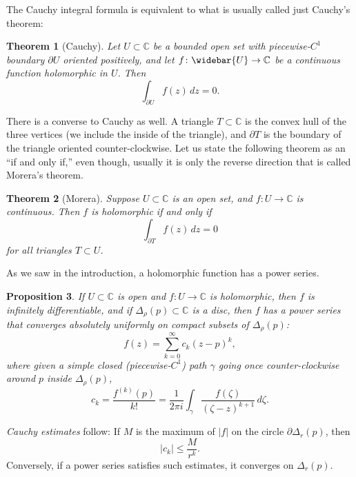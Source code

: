 \documentclass[12pt,openany]{book}
\newcommand{\sabs}[1]{\lvert {#1} \rvert}
\newcommand{\C}{{\mathbb{C}}}
\newcommand{\myindex}[1]{#1\index{#1}}
\theoremstyle{plain}
\newtheorem{thm}{Theorem}[section]
\newtheorem{prop}[thm]{Proposition}
\theoremstyle{remark}
\theoremstyle{definition}
\theoremstyle{exercise}
\theoremstyle{example}
\begin{document}
The Cauchy integral formula is equivalent to
what is usually called just Cauchy's theorem:

\begin{thm}[Cauchy]
Let $U \subset \C$ be a bounded open set with piecewise-$C^1$ boundary
$\partial U$ oriented positively, and let
$f \colon \widebar{U} \to \C$ be a continuous function
holomorphic in $U$.  Then
\begin{equation*}
\int_{\partial U}
f(z) \, dz = 0 .
\end{equation*}
\end{thm}

There is a converse to Cauchy as well.  A triangle $T \subset \C$ is
the convex hull of the three vertices (we include the inside of the
triangle), and $\partial T$ is the boundary of the triangle oriented
counter-clockwise.  Let us state the following theorem as an
``if and only if,'' even though, usually it is only the reverse direction that
is called Morera's theorem.

\begin{thm}[Morera] \label{thm:onevarmorera}
Suppose $U \subset \C$ is an open set, and $f \colon U \to \C$
is continuous.  Then $f$ is holomorphic
if and only if
\begin{equation*}
\int_{\partial T} f(z) \, dz = 0
\end{equation*}
for all triangles $T \subset U$.
\end{thm}

As we saw in the introduction, a holomorphic function has a power series.

\begin{prop}
If $U \subset \C$ is open and $f \colon U \to \C$ is holomorphic,
then $f$ is infinitely differentiable, and if $\Delta_\rho(p) \subset \C$
is a disc, then $f$ has a power series that
converges absolutely uniformly on compact subsets of $\Delta_\rho(p)$:
\begin{equation*}
f(z) = \sum_{k=0}^\infty c_k {(z-p)}^k ,
\end{equation*}
where given a simple closed (piecewise-$C^1$) path $\gamma$
going once counter-clockwise
around $p$ inside $\Delta_\rho(p)$,
\begin{equation*}
c_k = \frac{f^{(k)}(p)}{k!} =
\frac{1}{2\pi i}
\int_{\gamma}
\frac{f(\zeta)}{{(\zeta-z)}^{k+1}}
\,
d \zeta  .
\end{equation*}
\end{prop}

\emph{\myindex{Cauchy estimates}} follow:  If $M$
is the maximum of $\sabs{f}$ on the circle $\partial \Delta_r(p)$, then
\begin{equation*}
\sabs{c_k} \leq \frac{M}{r^k} .
\end{equation*}
Conversely, if a power series satisfies such estimates,
it converges on $\Delta_r(p)$.
\end{document}
